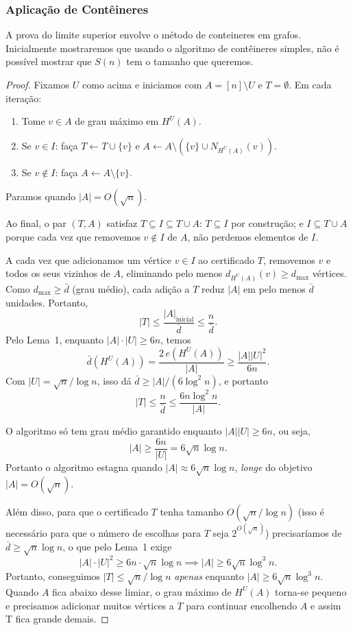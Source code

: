 \documentclass[reqno,a4paper,12pt]{amsart}
\begin{document}
\subsubsection{Aplicação de Contêineres}
A prova do limite superior envolve o método de conteineres em grafos. Inicialmente mostraremos que usando o algoritmo de contêineres simples, não é possível mostrar que $S(n)$ tem o tamanho que queremos.
\begin{proof}

  Fixamos $U$ como acima e iniciamos com $A = [n] \setminus U$ e $T = \emptyset$.
  Em cada iteração:
  \begin{enumerate}
    \item Tome $v \in A$ de grau máximo em $H^U(A)$.
    \item Se $v \in I$: faça $T \leftarrow T \cup \{v\}$ e $A \leftarrow A \setminus (\{v\} \cup N_{H^U(A)}(v))$.
    \item Se $v \notin I$: faça $A \leftarrow A \setminus \{v\}$.
  \end{enumerate}
  Paramos quando $|A| = O(\sqrt{n})$.

  Ao final, o par $(T, A)$ satisfaz $T \subseteq I \subseteq T \cup A$:
  $T \subseteq I$ por construção; e $I \subseteq T \cup A$ porque cada vez que
  removemos $v \notin I$ de $A$, não perdemos elementos de $I$.

  A cada vez que adicionamos um vértice $v \in I$ ao certificado $T$,
  removemos $v$ e todos os seus vizinhos de $A$, eliminando pelo menos
  $d_{H^U(A)}(v) \geq d_{\max}$ vértices.
  Como $d_{\max} \geq \bar{d}$ (grau médio), cada adição a $T$ reduz $|A|$
  em pelo menos $\bar{d}$ unidades. Portanto,
  \[
    |T| \leq \frac{|A|_{\text{inicial}}}{\bar{d}} \leq \frac{n}{\bar{d}}.
  \]
  Pelo Lema~1, enquanto $|A| \cdot |U| \geq 6n$, temos
  \[
    \bar{d}(H^U(A))
    = \frac{2\,e(H^U(A))}{|A|}
    \geq \frac{|A||U|^2}{6n}.
  \]
  Com $|U| = \sqrt{n}/\log n$, isso dá $\bar{d} \geq |A|/(6\log^2 n)$, e portanto
  \[
    |T| \leq \frac{n}{\bar{d}} \leq \frac{6n\log^2 n}{|A|}.
  \]

  O algoritmo só tem grau médio garantido enquanto $|A||U| \geq 6n$, ou seja,
  \[
    |A| \geq \frac{6n}{|U|} = 6\sqrt{n}\log n.
  \]
  Portanto o algoritmo estagna quando $|A| \approx 6\sqrt{n}\log n$,
  \emph{longe} do objetivo $|A| = O(\sqrt{n})$.

  Além disso, para que o certificado $T$ tenha tamanho $O(\sqrt{n}/\log n)$ (isso é necessário para que o número de escolhas para $T$ seja $2^{O(\sqrt{n})}$) precisaríamos de $\bar{d} \geq \sqrt{n}\log n$, o que pelo Lema~1 exige
  \[
    |A| \cdot |U|^2 \geq 6n \cdot \sqrt{n}\log n
    \implies
    |A| \geq 6\sqrt{n}\log^3 n.
  \]
  Portanto, conseguimos $|T| \leq \sqrt{n}/\log n$ \emph{apenas} enquanto
  $|A| \geq 6\sqrt{n}\log^3 n$.
  Quando $A$ fica abaixo desse limiar, o grau máximo de $H^U(A)$ torna-se
  pequeno e precisamos adicionar muitos vértices a $T$ para continuar
  encolhendo $A$ e assim T fica grande demais.


\end{proof}
\end{document}
